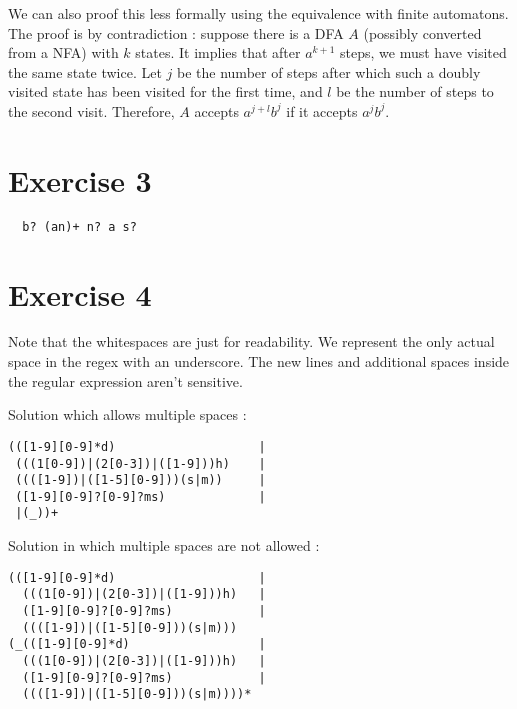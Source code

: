 \documentclass[a4paper,11pt]{report}
\begin{document}
We can also proof this less formally using the equivalence with finite
automatons. The proof is by contradiction : suppose there is a DFA $A$
(possibly converted from a NFA) with $k$ states. It implies that after $a^{k+1}$
steps, we must have visited the same state twice. Let $j$ be the number of steps
after which such a doubly visited state has been visited for the first time, and
$l$ be the number of steps to the second visit. Therefore, $A$ accepts
$a^{j+l}b^{j}$ if it accepts $a^jb^j$.

\section*{Exercise 3}

\begin{verbatim}
  b? (an)+ n? a s?
\end{verbatim}

\section*{Exercise 4}

Note that the whitespaces are just for readability. We represent the only actual
space in the regex with an underscore. The new lines and additional spaces
inside the regular expression aren't sensitive.

Solution which allows multiple spaces :

\begin{verbatim}
(([1-9][0-9]*d)                    |
 (((1[0-9])|(2[0-3])|([1-9]))h)    |
 ((([1-9])|([1-5][0-9]))(s|m))     |
 ([1-9][0-9]?[0-9]?ms)             |
 |(_))+
\end{verbatim}

Solution in which multiple spaces are not allowed :

\begin{verbatim}
(([1-9][0-9]*d)                    |
  (((1[0-9])|(2[0-3])|([1-9]))h)   |
  ([1-9][0-9]?[0-9]?ms)            |
  ((([1-9])|([1-5][0-9]))(s|m)))
(_(([1-9][0-9]*d)                  |
  (((1[0-9])|(2[0-3])|([1-9]))h)   |
  ([1-9][0-9]?[0-9]?ms)            |
  ((([1-9])|([1-5][0-9]))(s|m))))*
\end{verbatim}
\end{document}

